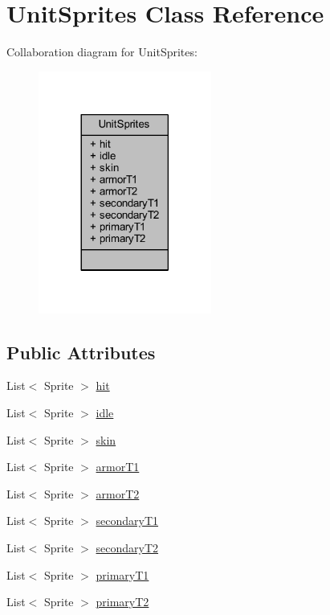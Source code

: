 \hypertarget{class_unit_sprites}{}\section{Unit\+Sprites Class Reference}
\label{class_unit_sprites}


Collaboration diagram for Unit\+Sprites\+:\nopagebreak
\begin{figure}[H]
\begin{center}
\leavevmode
\includegraphics[width=161pt]{class_unit_sprites__coll__graph}
\end{center}
\end{figure}
\subsection*{Public Attributes}
\begin{DoxyCompactItemize}
\item 
List$<$ Sprite $>$ \mbox{\hyperlink{class_unit_sprites_a04dea1b07a4c9d2268e710338281d8f6}{hit}}
\item 
List$<$ Sprite $>$ \mbox{\hyperlink{class_unit_sprites_a7dab10edddb2f02aac97a699ad4bd877}{idle}}
\item 
List$<$ Sprite $>$ \mbox{\hyperlink{class_unit_sprites_a0fb8aecfe21f48454c0ff88e3e62b46b}{skin}}
\item 
List$<$ Sprite $>$ \mbox{\hyperlink{class_unit_sprites_a240fd076990a1d5415b0bf646811def5}{armor\+T1}}
\item 
List$<$ Sprite $>$ \mbox{\hyperlink{class_unit_sprites_a067a815643b14259b578d068a89fe847}{armor\+T2}}
\item 
List$<$ Sprite $>$ \mbox{\hyperlink{class_unit_sprites_ad5ba8963e97a5efd3bb56be95e573b1e}{secondary\+T1}}
\item 
List$<$ Sprite $>$ \mbox{\hyperlink{class_unit_sprites_afce363dd582be88b65df9b081a932400}{secondary\+T2}}
\item 
List$<$ Sprite $>$ \mbox{\hyperlink{class_unit_sprites_a628613428a3a72eacba6610e0b332a51}{primary\+T1}}
\item 
List$<$ Sprite $>$ \mbox{\hyperlink{class_unit_sprites_a2991644582def68ae1ab58e7f887acb8}{primary\+T2}}
\end{DoxyCompactItemize}


